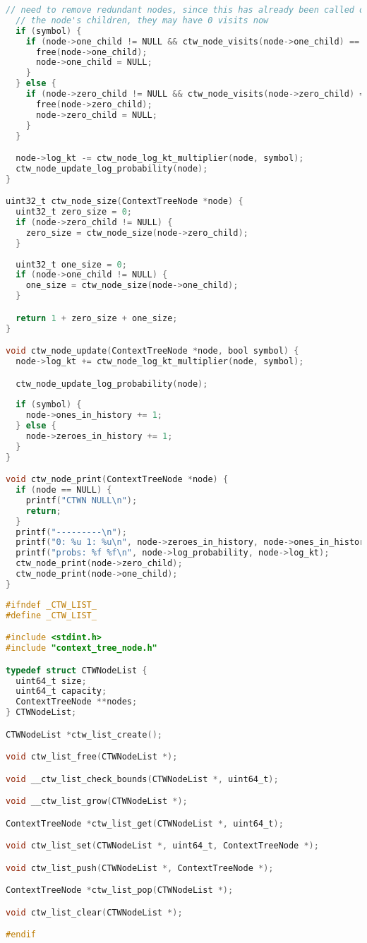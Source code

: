 \documentclass[fancychapters]{report}   	%
\begin{document}
\begin{lstlisting}[language=C,caption={context_tree_node.c}]
  // need to remove redundant nodes, since this has already been called on
  // the node's children, they may have 0 visits now
  if (symbol) {
    if (node->one_child != NULL && ctw_node_visits(node->one_child) == 0) {
      free(node->one_child);
      node->one_child = NULL;
    }
  } else {
    if (node->zero_child != NULL && ctw_node_visits(node->zero_child) == 0) {
      free(node->zero_child);
      node->zero_child = NULL;
    }
  }

  node->log_kt -= ctw_node_log_kt_multiplier(node, symbol);
  ctw_node_update_log_probability(node);
}

uint32_t ctw_node_size(ContextTreeNode *node) {
  uint32_t zero_size = 0;
  if (node->zero_child != NULL) {
    zero_size = ctw_node_size(node->zero_child);
  }
  
  uint32_t one_size = 0;
  if (node->one_child != NULL) {
    one_size = ctw_node_size(node->one_child);
  }

  return 1 + zero_size + one_size;
}

void ctw_node_update(ContextTreeNode *node, bool symbol) {
  node->log_kt += ctw_node_log_kt_multiplier(node, symbol);

  ctw_node_update_log_probability(node);
  
  if (symbol) {
    node->ones_in_history += 1;
  } else {
    node->zeroes_in_history += 1;
  } 
}

void ctw_node_print(ContextTreeNode *node) {
  if (node == NULL) {
    printf("CTWN NULL\n");
    return;
  }
  printf("---------\n");
  printf("0: %u 1: %u\n", node->zeroes_in_history, node->ones_in_history);
  printf("probs: %f %f\n", node->log_probability, node->log_kt);
  ctw_node_print(node->zero_child);
  ctw_node_print(node->one_child);
}
\end{lstlisting}
\begin{lstlisting}[language=C,caption={ctw_list.h}]
#ifndef _CTW_LIST_
#define _CTW_LIST_

#include <stdint.h>
#include "context_tree_node.h"

typedef struct CTWNodeList {
  uint64_t size;
  uint64_t capacity;
  ContextTreeNode **nodes;
} CTWNodeList;

CTWNodeList *ctw_list_create();

void ctw_list_free(CTWNodeList *);

void __ctw_list_check_bounds(CTWNodeList *, uint64_t);

void __ctw_list_grow(CTWNodeList *);

ContextTreeNode *ctw_list_get(CTWNodeList *, uint64_t);

void ctw_list_set(CTWNodeList *, uint64_t, ContextTreeNode *);

void ctw_list_push(CTWNodeList *, ContextTreeNode *);

ContextTreeNode *ctw_list_pop(CTWNodeList *);

void ctw_list_clear(CTWNodeList *);

#endif
\end{lstlisting}
\end{document}
